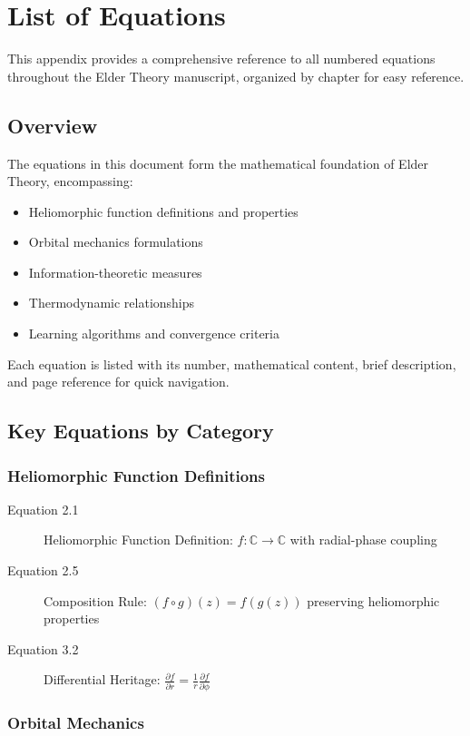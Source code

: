 \chapter{List of Equations}

This appendix provides a comprehensive reference to all numbered equations throughout the Elder Theory manuscript, organized by chapter for easy reference.

\section{Overview}

The equations in this document form the mathematical foundation of Elder Theory, encompassing:
\begin{itemize}
    \item Heliomorphic function definitions and properties
    \item Orbital mechanics formulations
    \item Information-theoretic measures
    \item Thermodynamic relationships
    \item Learning algorithms and convergence criteria
\end{itemize}

Each equation is listed with its number, mathematical content, brief description, and page reference for quick navigation.

\section{Key Equations by Category}

\subsection{Heliomorphic Function Definitions}

\begin{description}
\item[Equation 2.1] Heliomorphic Function Definition: $f: \mathbb{C} \to \mathbb{C}$ with radial-phase coupling
\item[Equation 2.5] Composition Rule: $(f \circ g)(z) = f(g(z))$ preserving heliomorphic properties
\item[Equation 3.2] Differential Heritage: $\frac{\partial f}{\partial r} = \frac{1}{r}\frac{\partial f}{\partial \phi}$
\end{description}

\subsection{Orbital Mechanics}

